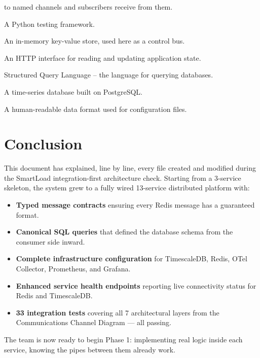 \documentclass[12pt, a4paper]{article}
\begin{document}
\begin{description}[leftmargin=3cm, style=nextline]
        to named channels and subscribers receive from them.
  \item[pytest] A Python testing framework.
  \item[Redis] An in-memory key-value store, used here as a control bus.
  \item[REST API] An HTTP interface for reading and updating application state.
  \item[SQL] Structured Query Language -- the language for querying databases.
  \item[TimescaleDB] A time-series database built on PostgreSQL.
  \item[YAML] A human-readable data format used for configuration files.
\end{description}

\section*{Conclusion}

This document has explained, line by line, every file created and modified
during the SmartLoad integration-first architecture check. Starting from a
3-service skeleton, the system grew to a fully wired 13-service distributed
platform with:

\begin{itemize}
  \item \textbf{Typed message contracts} ensuring every Redis message has a
        guaranteed format.
  \item \textbf{Canonical SQL queries} that defined the database schema from
        the consumer side inward.
  \item \textbf{Complete infrastructure configuration} for TimescaleDB, Redis,
        OTel Collector, Prometheus, and Grafana.
  \item \textbf{Enhanced service health endpoints} reporting live connectivity
        status for Redis and TimescaleDB.
  \item \textbf{33 integration tests} covering all 7 architectural layers from
        the Communications Channel Diagram --- all passing.
\end{itemize}

The team is now ready to begin Phase 1: implementing real logic inside each
service, knowing the pipes between them already work.
\end{document}
